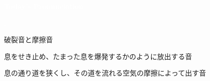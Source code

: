\documentclass[aspectratio=169, xcolor={dvipsnames,table}]{beamer}
\begin{document}
\begin{frame}
  \centering
  \textcolor{white}{\Huge\bfseries Today's Pronunciation}\pause

  \vspace{30pt}

  \textcolor{white}{\Huge\bfseries {}, }
\end{frame}
\begin{frame}[plain]{破裂音と摩擦音}
  \large

  \begin{description}[<+->]
    \item[破裂音] 息をせき止め、たまった息を爆発するかのように放出する音\\ \hspace{10pt}
           \hspace{10pt}

    \item[摩擦音] 息の通り道を狭くし、その道を流れる空気の摩擦によって出す音
  \end{description}
\end{frame}
\end{document}
